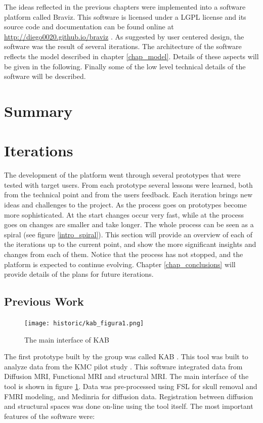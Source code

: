 The ideas reflected in the previous chapters were implemented into a software platform called Braviz. This software is licensed under a LGPL license and its source code and documentation can be found online at \url{http://diego0020.github.io/braviz} . As suggested by user centered design, the software was the result of several iterations. The architecture of the software reflects the model described in chapter \ref{chap_model}. Details of these aspects will be given in the following. Finally some of the low level technical details of the software will be described.

\section{Summary}

\section{Iterations}
\label{sec_iterations}



The development of the platform went through several prototypes that were tested with target users. From each prototype several lessons were learned, both from the technical point and from the users feedback. Each iteration brings new ideas and challenges to the project. As the process goes on prototypes become more sophisticated. At the start changes occur very fast, while at the process goes on changes are smaller and take longer. The whole process can be seen as a spiral (see figure \ref{intro_spiral}). This section will provide an overview of each of the iterations up to the current point, and show the more significant insights and changes from each of them. Notice that the process has not stopped, and the platform is expected to continue evolving. Chapter \ref{chap_conclusions} will provide details of the plans for future iterations.

\subsection{Previous Work}
\label{sec_kab}
\begin{figure}
\centering
\texttt{[image: historic/kab\_figura1.png]}
\caption{\label{fig_kab}The main interface of KAB}
\end{figure}

The first prototype built by the group was called KAB \autocite{castro_kab:_2012}. This tool was built to analyze data from the KMC pilot study \autocite{schneider_cerebral_2012}. This software integrated data from Diffusion MRI, Functional MRI and structural MRI. The main interface of the tool is shown in figure \ref{fig_kab}. Data was pre-processed using FSL \autocite{jenkinson_fsl_2012} for skull removal and FMRI modeling, and Medinria \autocite{toussaint_medinria:_2007} for diffusion data. Registration between diffusion and structural spaces was done on-line using the tool itself. The most important features of the software were:

